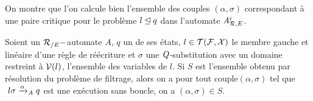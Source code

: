 On montre que l'on calcule bien l'ensemble des couples $(\alpha,\sigma)$
correspondant à une paire critique pour le problème $l \unlhd q$ dans l'automate ${\mathit A}_{\mathcal R,E}^i$.

\begin{property}
  \label{prop:matching-complete}
  Soient un ${\mathcal R_{/E}}-$automate $A$, $q$ un de ses états, $l \in \mathcal{T(F, X)}$ le
  membre gauche et linéaire d'une règle de réécriture et $\sigma$ une
  $\mathit Q$-substitution avec un domaine restreint à $\mathcal V(l)$, l'ensemble des variables de $l$.
  Si $S$ est l'ensemble obtenu par résolution du problème de filtrage, alors on a pour
  tout couple$(\alpha, \sigma)$ tel que $\ l\sigma \xrightarrow{\alpha}_\mathit A q$ est une
  exécution sans boucle, on a $(\alpha, \sigma) \in S$.
\end{property}

